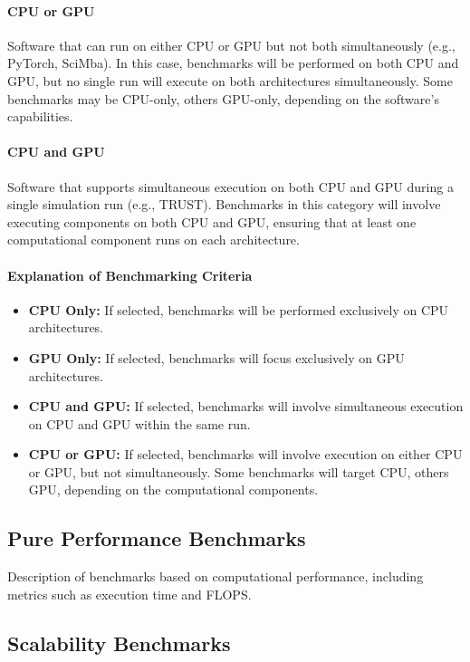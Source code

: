 \paragraph{CPU or GPU}
Software that can run on either CPU or GPU but not both simultaneously (e.g., PyTorch, SciMba). In this case, benchmarks will be performed on both CPU and GPU, but no single run will execute on both architectures simultaneously. Some benchmarks may be CPU-only, others GPU-only, depending on the software's capabilities.

\paragraph{CPU and GPU}
Software that supports simultaneous execution on both CPU and GPU during a single simulation run (e.g., TRUST). Benchmarks in this category will involve executing components on both CPU and GPU, ensuring that at least one computational component runs on each architecture.

\paragraph{Explanation of Benchmarking Criteria}
\begin{itemize}
    \item \textbf{CPU Only:} If selected, benchmarks will be performed exclusively on CPU architectures.
    \item \textbf{GPU Only:} If selected, benchmarks will focus exclusively on GPU architectures.
    \item \textbf{CPU and GPU:} If selected, benchmarks will involve simultaneous execution on CPU and GPU within the same run.
    \item \textbf{CPU or GPU:} If selected, benchmarks will involve execution on either CPU or GPU, but not simultaneously. Some benchmarks will target CPU, others GPU, depending on the computational components.
\end{itemize}


\subsection{Pure Performance Benchmarks}
\label{sec:methodology-types-performance}
Description of benchmarks based on computational performance, including metrics such as execution time and FLOPS.

\subsection{Scalability Benchmarks}
\label{sec:methodology-types-scalability}


